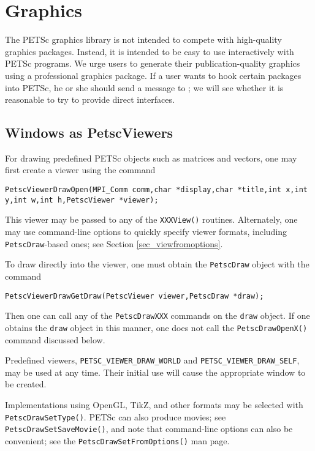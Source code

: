 {{\section{Graphics}
\label{sec_graphics}

The PETSc graphics library is not intended to compete with
high-quality graphics packages.  Instead, it is intended to be
easy to use interactively with PETSc programs. We urge users
to generate their publication-quality graphics using a
professional graphics package. If a user wants to hook
certain packages into PETSc, he or she should send a message to
\href{mailto:petsc-maint@mcs.anl.gov}{};
we will see whether it is reasonable to try to provide direct interfaces.

\subsection{Windows as PetscViewers}
For drawing predefined PETSc objects such as matrices and vectors, one may
first create a viewer using the
command
\begin{lstlisting}
PetscViewerDrawOpen(MPI_Comm comm,char *display,char *title,int x,int y,int w,int h,PetscViewer *viewer);
\end{lstlisting}
This viewer may be passed to any of the \lstinline{XXXView()} routines.
Alternately, one may use command-line options to quickly specify viewer formats, 
including \lstinline{PetscDraw}-based ones; see Section \ref{sec_viewfromoptions}.

To draw directly into the viewer, one must obtain the \lstinline{PetscDraw} object with the
command
\begin{lstlisting}
PetscViewerDrawGetDraw(PetscViewer viewer,PetscDraw *draw);
\end{lstlisting}
Then one can call any of the \lstinline{PetscDrawXXX} commands on the \lstinline{draw}
object. If one obtains the \lstinline{draw} object in this manner,
one does not call the \lstinline{PetscDrawOpenX()} command discussed below.

Predefined viewers, \lstinline{PETSC_VIEWER_DRAW_WORLD}
and \lstinline{PETSC_VIEWER_DRAW_SELF}, may be used at any time. Their initial
use will cause the appropriate window to be created.

Implementations using OpenGL, TikZ, and other formats may be selected with
\lstinline{PetscDrawSetType()}.
PETSc can also produce movies; see \lstinline{PetscDrawSetSaveMovie()}, and
note that command-line options can also be convenient; see the \lstinline{PetscDrawSetFromOptions()} man page.

}}
